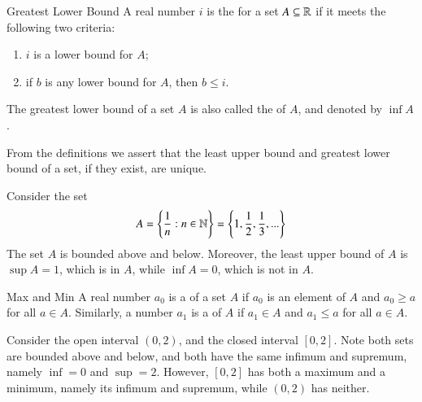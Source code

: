 \documentclass[12pt]{report}
\begin{document}
\begin{defn}{Greatest Lower Bound}{}
    A real number $i$ is the  for a set $A \subseteq \mathbb R$ if it meets the following two criteria: \begin{enumerate}
        \item $i$ is a lower bound for $A$;
        \item if $b$ is any lower bound for $A$, then $b \leq i$.
    \end{enumerate}
    The greatest lower bound of a set $A$ is also called the  of $A$, and denoted by $\inf A$.
\end{defn}


\begin{rmk}{}{}
    From the definitions we assert that the least upper bound and greatest lower bound of a set, if they exist, are unique.
\end{rmk}


\begin{eg*}{}{}
    Consider the set $$A = \left\{\frac{1}{n}:n\in\mathbb N\right\} = \left\{1,\frac{1}{2},\frac{1}{3},...\right\}$$ The set $A$ is bounded above and below. Moreover, the least upper bound of $A$ is $\sup A = 1$, which is in $A$, while $\inf A = 0$, which is not in $A$.
\end{eg*}


\begin{defn}{Max and Min}{}
    A real number $a_0$ is a  of a set $A$ if $a_0$ is an element of $A$ and $a_0 \geq a$ for all $a \in A$. Similarly, a number $a_1$ is a  of $A$ if $a_1 \in A$ and $a_1 \leq a$ for all $a \in A$.
\end{defn}

\begin{eg*}{}{}
    Consider the open interval $(0,2)$, and the closed interval $[0,2]$. Note both sets are bounded above and below, and both have the same infimum and supremum, namely $\inf = 0$ and $\sup = 2$. However, $[0,2]$ has both a maximum and a minimum, namely its infimum and supremum, while $(0,2)$ has neither.
\end{eg*}
\end{document}
